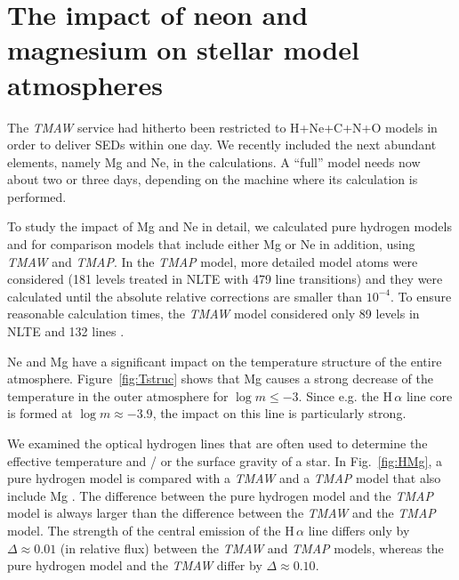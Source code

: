 \documentclass[11pt,twoside]{article}
\begin{document}
\section{The impact of neon and magnesium on stellar model atmospheres}
\label{sect:nemg}

The \emph{TMAW} service had hitherto been restricted
to H+Ne+C+N+O models in order to deliver SEDs within one day.
We recently included the next abundant elements, namely Mg and Ne,
in the calculations. A ``full'' model needs now about two or three days,
depending on the machine where its calculation is performed.

To study the impact of Mg and Ne in detail, we calculated pure hydrogen models 
and for comparison models that include either Mg or Ne in addition, using 
\emph{TMAW} and \emph{TMAP}. In the \emph{TMAP} model, more detailed model atoms 
were considered (181 levels treated in NLTE with 479 line transitions)
and they were calculated until the absolute relative corrections are smaller 
than $10^{-4}$. To ensure reasonable calculation times,  the \emph{TMAW} model 
considered only 89 levels in NLTE and 132 lines \citep[cf\@.][]{rauchringat2012}.

Ne and Mg have a significant impact on the temperature structure of the entire atmosphere.
Figure~\ref{fig:Tstruc} shows that Mg causes a strong decrease of the temperature in the outer
atmosphere for $\log m \leq -3$. Since e.g\@. the H\,$\alpha$ line core is formed at 
$\log m \approx -3.9$, the impact on this line is particularly strong.

We examined the optical hydrogen lines that are often used to determine the effective 
temperature and / or the surface gravity of a star. In Fig.~\ref{fig:HMg}, a pure 
hydrogen model is compared with a \emph{TMAW} and a \emph{TMAP} model that also include 
Mg \citep[$T_\mathrm{eff}=60\,\mathrm{kK}$, $\log g = 7$, solar abundances,][]{asplundetal2009}.
The difference between the pure hydrogen model and the 
\emph{TMAP} model is always larger than the difference between the \emph{TMAW} and 
the \emph{TMAP} model. The strength of the central emission of the H\,$\alpha$ line differs 
only by $\Delta \approx 0.01$ (in relative flux) between the \emph{TMAW} and \emph{TMAP} models, 
whereas the pure hydrogen model and the \emph{TMAW} differ by $\Delta \approx 0.10$.
\end{document}
